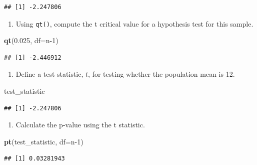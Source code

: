 \documentclass[
]{book}
\newenvironment{Shaded}{\begin{snugshade}}{\end{snugshade}}
\newcommand{\AttributeTok}[1]{\textcolor[rgb]{0.13,0.29,0.53}{#1}}
\newcommand{\DecValTok}[1]{\textcolor[rgb]{0.00,0.00,0.81}{#1}}
\newcommand{\FloatTok}[1]{\textcolor[rgb]{0.00,0.00,0.81}{#1}}
\newcommand{\FunctionTok}[1]{\textcolor[rgb]{0.13,0.29,0.53}{\textbf{#1}}}
\newcommand{\NormalTok}[1]{#1}
\providecommand{\tightlist}{%
  \setlength{\itemsep}{0pt}\setlength{\parskip}{0pt}}
\theoremstyle{definition}
\theoremstyle{definition}
\theoremstyle{definition}
\theoremstyle{definition}
\theoremstyle{remark}
\begin{document}
\begin{verbatim}
## [1] -2.247806
\end{verbatim}

\begin{enumerate}
\def\labelenumi{\arabic{enumi}.}
\setcounter{enumi}{1}
\tightlist
\item
  Using \texttt{qt()}, compute the t critical value for a hypothesis test for this sample.
\end{enumerate}

\begin{Shaded}
\begin{Highlighting}[]
\FunctionTok{qt}\NormalTok{(}\FloatTok{0.025}\NormalTok{, }\AttributeTok{df=}\NormalTok{n}\DecValTok{{-}1}\NormalTok{)}
\end{Highlighting}
\end{Shaded}

\begin{verbatim}
## [1] -2.446912
\end{verbatim}

\begin{enumerate}
\def\labelenumi{\arabic{enumi}.}
\setcounter{enumi}{2}
\tightlist
\item
  Define a test statistic, \(t\), for testing whether the population mean is 12.
\end{enumerate}

\begin{Shaded}
\begin{Highlighting}[]
\NormalTok{test\_statistic}
\end{Highlighting}
\end{Shaded}

\begin{verbatim}
## [1] -2.247806
\end{verbatim}

\begin{enumerate}
\def\labelenumi{\arabic{enumi}.}
\setcounter{enumi}{3}
\tightlist
\item
  Calculate the p-value using the t statistic.
\end{enumerate}

\begin{Shaded}
\begin{Highlighting}[]
\FunctionTok{pt}\NormalTok{(test\_statistic, }\AttributeTok{df=}\NormalTok{n}\DecValTok{{-}1}\NormalTok{)}
\end{Highlighting}
\end{Shaded}

\begin{verbatim}
## [1] 0.03281943
\end{verbatim}
\end{document}
